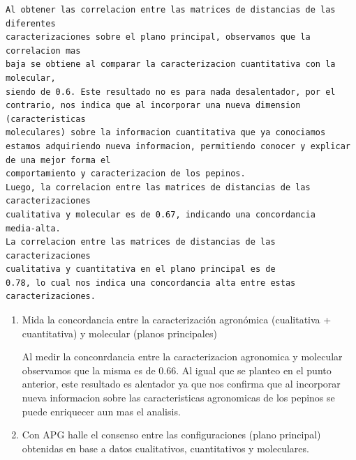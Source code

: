 \documentclass[
]{article}
\begin{document}
\begin{verbatim}
Al obtener las correlacion entre las matrices de distancias de las diferentes
caracterizaciones sobre el plano principal, observamos que la correlacion mas
baja se obtiene al comparar la caracterizacion cuantitativa con la molecular,
siendo de 0.6. Este resultado no es para nada desalentador, por el
contrario, nos indica que al incorporar una nueva dimension (caracteristicas
moleculares) sobre la informacion cuantitativa que ya conociamos
estamos adquiriendo nueva informacion, permitiendo conocer y explicar de una mejor forma el
comportamiento y caracterizacion de los pepinos. 
Luego, la correlacion entre las matrices de distancias de las caracterizaciones 
cualitativa y molecular es de 0.67, indicando una concordancia
media-alta.
La correlacion entre las matrices de distancias de las caracterizaciones 
cualitativa y cuantitativa en el plano principal es de
0.78, lo cual nos indica una concordancia alta entre estas caracterizaciones.
\end{verbatim}

\begin{enumerate}
\def\labelenumi{\Alph{enumi})}
\item
  Mida la concordancia entre la caracterización agronómica (cualitativa
  + cuantitativa) y molecular (planos principales)

  Al medir la conconrdancia entre la caracterizacion agronomica y
  molecular observamos que la misma es de 0.66. Al igual que se planteo
  en el punto anterior, este resultado es alentador ya que nos confirma
  que al incorporar nueva informacion sobre las caracteristicas
  agronomicas de los pepinos se puede enriquecer aun mas el analisis.
\item
  Con APG halle el consenso entre las configuraciones (plano principal)
  obtenidas en base a datos cualitativos, cuantitativos y moleculares.
\end{enumerate}
\end{document}
